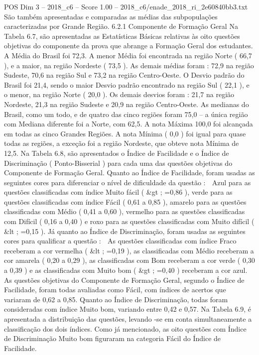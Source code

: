 \begin{textsample}{POS Dim 3 – 2018\_c6 – Score 1.00 – 2018\_c6/enade\_2018\_ri\_2e60840bb3.txt}
São também apresentadas e comparadas as médias das subpopulações caracterizadas por Grande Região. 6.2.1 Componente de Formação Geral Na Tabela 6.7, são apresentadas as Estatísticas Básicas relativas às oito questões objetivas do componente da prova que abrange a Formação Geral dos estudantes.
A Média do Brasil foi 72,3.
A menor Média foi encontrada na região Norte ( 66,7 ), e a maior, na região Nordeste ( 73,5 ).
As demais médias foram : 72,9 na região Sudeste, 70,6 na região Sul e 73,2 na região Centro-Oeste.
O Desvio padrão do Brasil foi 21,4, sendo o maior Desvio padrão encontrado na região Sul ( 22,1 ), e o menor, na região Norte ( 20,0 ).
Os demais desvios foram : 21,7 na região Nordeste, 21,3 na região Sudeste e 20,9 na região Centro-Oeste.
As medianas do Brasil, como um todo, e de quatro das cinco regiões foram 75,0 – a única região com Mediana diferente foi a Norte, com 62,5.
A nota Máxima 100,0 foi alcançada em todas as cinco Grandes Regiões.
A nota Mínima ( 0,0 ) foi igual para quase todas as regiões, a exceção foi a região Nordeste, que obteve nota Mínima de 12,5.
Na Tabela 6.8, são apresentados o Índice de Facilidade e o Índice de Discriminação ( Ponto-Bisserial ) para cada uma das questões objetivas do Componente de Formação Geral.
Quanto ao Índice de Facilidade, foram usadas as seguintes cores para diferenciar o nível de dificuldade da questão :  Azul para as questões classificadas com índice Muito fácil ( \&gt ; =0,86 ), verde para as questões classificadas com índice Fácil ( 0,61 a 0,85 ), amarelo para as questões classificadas com Médio ( 0,41 a 0,60 ), vermelho para as questões classificadas com Difícil ( 0,16 a 0,40 ) e roxo para as questões classificadas com Muito difícil ( \&lt ; =0,15 ).
Já quanto ao Índice de Discriminação, foram usadas as seguintes cores para qualificar a questão :  As questões classificadas com índice Fraco receberam a cor vermelha ( \&lt ; =0,19 ), as classificadas com Médio receberam a cor amarela ( 0,20 a 0,29 ), as classificadas com Bom receberam a cor verde ( 0,30 a 0,39 ) e as classificadas com Muito bom ( \&gt ; =0,40 ) receberam a cor azul.
As questões objetivas do Componente de Formação Geral, segundo o Índice de Facilidade, foram todas avaliadas como Fácil, com índices de acertos que variaram de 0,62 a 0,85.
Quanto ao Índice de Discriminação, todas foram consideradas com índice Muito bom, variando entre 0,42 e 0,57.
Na Tabela 6.9, é apresentada a distribuição das questões, levando -se em conta simultaneamente a classificação dos dois índices.
Como já mencionado, as oito questões com Índice de Discriminação Muito bom figuraram na categoria Fácil do Índice de Facilidade.

\end{textsample}
